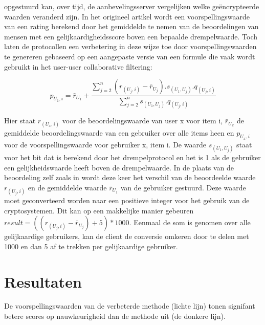 \documentclass[twocolumn]{phdsymp} %
\begin{document}
opgestuurd kan, over tijd, de aanbevelingsserver vergelijken welke ge\"encrypteerde waarden veranderd zijn. In het origineel artikel \cite{dyn} wordt een voorspellingswaarde van een rating berekend door het gemiddelde te nemen van de beoordelingen van mensen met een gelijkaardigheidsscore boven een bepaalde drempelwaarde. Toch laten de protocollen een verbetering in deze wijze toe door voorspellingswaarden te genereren gebaseerd op een aangepaste versie van een formule die vaak wordt gebruikt in het user-user collaborative filtering:

\begin{equation}\label{stdrecom}p_{U_1,i} = \bar{r}_{U_1} + \frac{\sum_{j=2}^{n}(r_{(U_j,i)} - \bar{r}_{U_j}).s_{(U_1,U_j)}.q_{(U_j,i)}}{\sum_{j=2}^{n} s_{(U_1,U_j)}.q_{(U_j,i)} }
\end{equation}

Hier staat $r_{(U_x,i)}$ voor de beoordelingswaarde van user x voor item i, $\bar{r}_{U_x}$ de gemiddelde beoordelingswaarde van een gebruiker over alle items heen en $p_{U_x,i}$ voor de voorspellingswaarde voor gebruiker x, item i.
De waarde $s_{(U_1,U_j)}$ staat voor het bit dat is berekend door het drempelprotocol en het is 1 als de gebruiker een gelijkheidswaarde heeft boven de drempelwaarde. In de plaats van de beoordeling zelf zoals in \cite{dyn} wordt deze keer het verschil van de beoordeelde waarde $r_{(U_j,i)}$ en de gemiddelde waarde $\bar{r}_{U_1}$ van de gebruiker gestuurd. Deze waarde moet geconverteerd worden naar een positieve integer voor het gebruik van de cryptosystemen. Dit kan op een makkelijke manier gebeuren $result = ((r_{(U_j,i)} - \bar{r}_{U_j})+5)*1000$. Eenmaal de som is genomen over alle gelijkaardige gebruikers, kan de client de conversie omkeren door te delen met 1000 en dan 5 af te trekken per gelijkaardige gebruiker.


\section{Resultaten}

De voorspellingswaarden van de verbeterde methode (lichte lijn) tonen signifant betere scores op nauwkeurigheid dan de methode uit \cite{dyn} (de donkere lijn).
\end{document}
